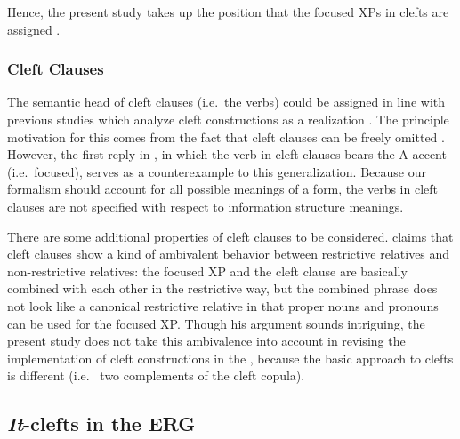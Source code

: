 \noindent Hence, the present study takes up the position that the
focused XPs in clefts are assigned .



\subsubsection{Cleft Clauses}
\label{10:sssec:clefts:cleft}


The semantic head of cleft clauses (i.e.\ the verbs) could be assigned
 in line with previous studies which analyze cleft
constructions as a  realization
\citep{paggio:09}. The principle motivation for this
comes from the fact that cleft clauses can be freely omitted
\citep{kim:12a}. However, the first reply in
, in which the verb in cleft
clauses bears the A-accent (i.e.\ focused), serves as a counterexample
to this generalization. Because our formalism should
account for all possible meanings of a form, the verbs in cleft
clauses are not specified with respect to information structure
meanings.



There are some additional properties of cleft clauses to be
considered.  \citet{kim:12a} claims that cleft clauses show a kind of
ambivalent behavior between restrictive relatives and non-restrictive
relatives: the focused XP and the cleft clause are basically combined
with each other in the restrictive way, but the
combined phrase does not look like a canonical restrictive relative in
that proper nouns and pronouns can be used for the focused XP.  Though
his argument sounds intriguing, the present study does not take this
ambivalence into account in revising the implementation of cleft
constructions in the , because the basic approach to clefts
is different (i.e.\  \vs two complements of the cleft
copula).




\subsection{\textit{It}-clefts in the ERG}
\label{10:sec:it-cleft}



